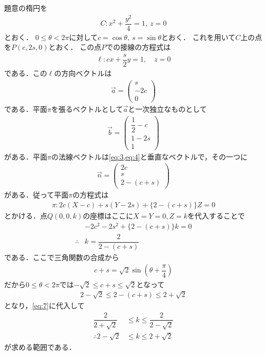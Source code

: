 \documentclass[../../main.tex]{subfiles}
\begin{document}
題意の楕円を
\begin{align}
  C: x^2+\dfrac{y^2}{4}=1,\ z=0 \label{eq:1}
\end{align}
とおく．
$0\le\theta<2\pi$に対して$c=\cos\theta,\ s=\sin\theta$とおく．
これを用いて$C$上の点を$P(c,2s,0)$とおく．
この点$P$での接線の方程式は
\begin{align}
  \ell: cx+\dfrac{s}{2}y=1, \quad z=0 \label{eq:2}
\end{align}
である．この$\ell$の方向ベクトルは
\begin{align}
  \vec a=
  \begin{pmatrix}s\\-2c\\0
  \end{pmatrix} \label{eq:3}
\end{align}
である．平面$\pi$を張るベクトルとして$\vec a$と一次独立なものとして
\begin{align}
  \vec b=
  \begin{pmatrix}\dfrac{1}{2}-c\\1-2s\\1
  \end{pmatrix} \label{eq:4}
\end{align}
がある．平面$\pi$の法線ベクトルは\cref{eq:3,eq:4}と垂直なベクトルで，その一つに
\begin{align}
  \vec n=
  \begin{pmatrix}2c\\s\\2-(c+s)
  \end{pmatrix} \label{eq:5}
\end{align}
がある．従って平面$\pi$の方程式は
\begin{align}
  \pi: 2c(X-c)+s(Y-2s)+\{2-(c+s)\}Z=0 \label{eq:6}
\end{align}
とかける．点$Q(0,0,k)$の座標はここに$X=Y=0, Z=k$を代入することで
\begin{align}
  & -2c^2-2s^2+\{2-(c+s)\}k=0 \\
  \therefore
  & k=\dfrac{2}{2-(c+s)} \label{eq:7}
\end{align}
である．ここで三角関数の合成から
\begin{align}
  c+s=\sqrt{2}\sin\left(\theta+\dfrac{\pi}{4}\right)
\end{align}
だから$0\le\theta<2\pi$では$-\sqrt{2}\le c+s\le\sqrt{2}$となって
\begin{align}
  2-\sqrt{2}\le2-(c+s)\le2+\sqrt{2}
\end{align}
となり，\cref{eq:7}に代入して
\begin{align}
  \dfrac{2}{2+\sqrt{2}}&\le k\le\dfrac{2}{2-\sqrt{2}} \\
  \therefore
  2-\sqrt{2}&\le k\le2+\sqrt{2}
\end{align}
が求める範囲である．

\newpage
\end{document}
